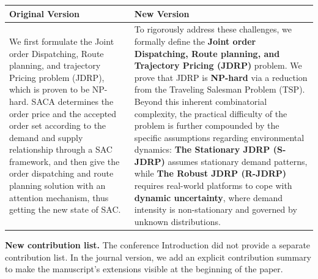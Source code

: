 \documentclass[11pt, a4paper]{article}
\begin{document}
\begin{itemize}
    \begin{tabular}{|p{}|p{}|}
        \hline
        \textbf{Original Version} & \textbf{New Version}\\
        \hline
        We first formulate the Joint order Dispatching, Route planning, and trajectory Pricing problem (JDRP), which is proven to be NP-hard. SACA determines the order price and the accepted order set according to the demand and supply relationship through a SAC framework, and then give the order dispatching and route planning solution with an attention mechanism, thus getting the new state of SAC. &
        To rigorously address these challenges, we formally define the \textbf{Joint order Dispatching, Route planning, and Trajectory Pricing (JDRP)} problem. We prove that JDRP is \textbf{NP-hard} via a reduction from the Traveling Salesman Problem (TSP). Beyond this inherent combinatorial complexity, the practical difficulty of the problem is further compounded by the specific assumptions regarding environmental dynamics: \textbf{The Stationary JDRP (S-JDRP)} assumes stationary demand patterns, while \textbf{The Robust JDRP (R-JDRP)} requires real-world platforms to cope with \textbf{dynamic uncertainty}, where demand intensity is non-stationary and governed by unknown distributions.\\
        \hline
    \end{tabular}

    \textbf{New contribution list.} The conference Introduction did not provide a separate contribution list. In the journal version, we add an explicit contribution summary to make the manuscript's extensions visible at the beginning of the paper.


\end{itemize}
\end{document}
